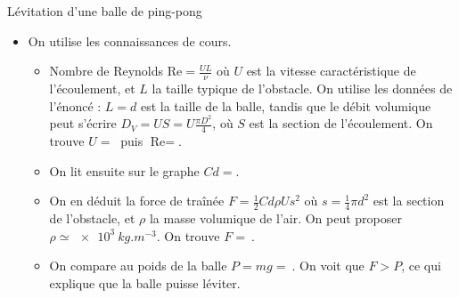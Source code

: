 \begin{exo}[2][problem]{Lévitation d’une balle de ping-pong}
{\begin{itemize}
    \item On utilise les connaissances de cours.
    \begin{itemize}
      \item
    Nombre de Reynolds $\text{Re} = \frac{UL}{\nu}$ où $U$ est la vitesse caractéristique de l'écoulement, et $L$ la taille typique de l'obstacle. On utilise les données de l'énoncé : $L=d$ est la taille de la balle, tandis que le débit volumique peut s'écrire $D_V = U S = U \frac{\pi D^2}{4}$, où $S$ est la section de l'écoulement. On trouve $U=\SI{}{}$ puis $\text{Re} = $.
    \item On lit ensuite sur le graphe $Cd = $.
    \item On en déduit la force de traînée $F = \frac{1}{2} Cd \rho U s^2$ où $s=\frac{1}{4}\pi d^2$
    est la section de l'obstacle, et $\rho$ la masse volumique de l'air. On peut proposer $\rho \simeq \SI{e3}{kg.m^{-3}}$. On trouve $F = \SI{}{}$.
    \item On compare au poids de la balle $P=mg = \SI{}{}$. On voit que $F>P$, ce qui explique que la balle puisse léviter.
  \end{itemize}
  \end{itemize}
  }
  \end{exo}
